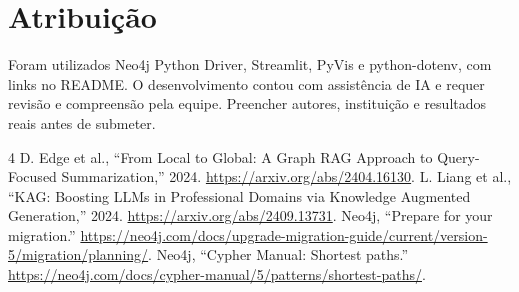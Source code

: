 \documentclass[conference]{IEEEtran}
\begin{document}
\section*{Atribuição}
Foram utilizados Neo4j Python Driver, Streamlit, PyVis e python-dotenv, com links no README. O desenvolvimento contou com assistência de IA e requer revisão e compreensão pela equipe. Preencher autores, instituição e resultados reais antes de submeter.

\begin{thebibliography}{4}
 D. Edge et al., ``From Local to Global: A Graph RAG Approach to Query-Focused Summarization,'' 2024. \url{https://arxiv.org/abs/2404.16130}.
 L. Liang et al., ``KAG: Boosting LLMs in Professional Domains via Knowledge Augmented Generation,'' 2024. \url{https://arxiv.org/abs/2409.13731}.
 Neo4j, ``Prepare for your migration.'' \url{https://neo4j.com/docs/upgrade-migration-guide/current/version-5/migration/planning/}.
 Neo4j, ``Cypher Manual: Shortest paths.'' \url{https://neo4j.com/docs/cypher-manual/5/patterns/shortest-paths/}.
\end{thebibliography}
\end{document}
